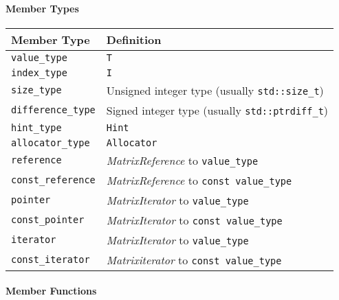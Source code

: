\paragraph{Member Types}

\begin{tabularx}{\textwidth}{l X}
\textbf{Member Type} & \textbf{Definition}\\
\hline
\texttt{value\_type} & \texttt{T} \\
\hline
\texttt{index\_type} & \texttt{I} \\
\hline
\texttt{size\_type} & Unsigned integer type (usually \texttt{std::size\_t})\\
\hline
\texttt{difference\_type} & Signed integer type (usually \texttt{std::ptrdiff\_t})\\
\hline
\texttt{hint\_type} & \texttt{Hint}\\
\hline
\texttt{allocator\_type} & \texttt{Allocator}\\
\hline
\texttt{reference} & \textit{MatrixReference} to \texttt{value\_type}\\
\hline
\texttt{const\_reference} & \textit{MatrixReference} to \texttt{const value\_type}\\
\hline
\texttt{pointer} & \textit{MatrixIterator} to \texttt{value\_type}\\
\hline
\texttt{const\_pointer} & \textit{MatrixIterator} to \texttt{const value\_type}\\
\hline
\texttt{iterator} & \textit{MatrixIterator} to \texttt{value\_type}\\
\hline
\texttt{const\_iterator} & \textit{Matrixiterator} to \texttt{const value\_type}\\
\end{tabularx}

\paragraph{Member Functions}


